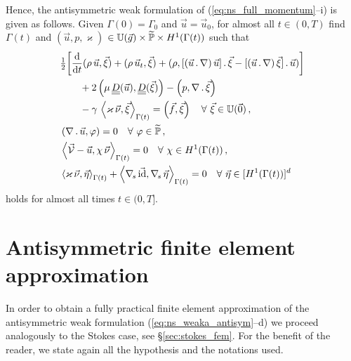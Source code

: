 Hence, the antisymmetric weak formulation of (\ref{eq:ns_full_momentum}--i) is
given as follows. Given $\Gamma(0) = \Gamma_0$ and $\vec u = \vec u_0$, for
almost all $t\in(0,T)$ find $\Gamma(t)$ and ${(\vec u, p, \varkappa)}$ ${\in
\mathbb{U}(\vec{g}) \times \widetilde{\mathbb{P}} \times H^1(\Gamma(t))}$ such that
\begin{subequations}
\begin{align}
& \tfrac{1}{2}\bigg[ \ddt (\rho\,\vec u, \vec \xi) + (\rho\,\vec u_t, \vec \xi)
+ (\rho, [(\vec u\,.\,\nabla)\,\vec u]\,.\,\vec \xi
- [(\vec u\,.\,\nabla)\,\vec \xi]\,.\,\vec u)\bigg] \nonumber \\
& \qquad +2\left(\mu\,\mat D(\vec u), \mat D(\vec \xi)\right)
- \left(p, \nabla\,.\,\vec \xi\right)\nonumber \\
& \qquad - \gamma\,\left\langle \varkappa\,\vec\nu, \vec\xi
\right\rangle_{\Gamma(t)}
= \left(\vec f, \vec \xi\right)\quad \forall\ \vec\xi \in \uspace 0 \,,
\label{eq:ns_weaka_antisym}\\
& \left(\nabla\,.\,\vec u, \varphi\right) = 0
\quad \forall\ \varphi \in \pnormspace\,, \label{eq:ns_weakb_antisym} \\
&  \left\langle \V
- \vec u, \chi\,\vec\nu \right\rangle_{\Gamma(t)} = 0
\quad \forall\ \chi \in H^1(\Gamma(t))\,, \label{eq:ns_weakc_antisym} \\
& \left\langle \varkappa\,\vec\nu, \vec\eta \right\rangle_{\Gamma(t)}
+ \left\langle \nabs\,\vec \id, \nabs\,\vec \eta \right\rangle_{\Gamma(t)}
= 0  \quad \forall\ \vec\eta \in [H^1(\Gamma(t))]^d\,\label{eq:ns_weakd_antisym}
\end{align}
\end{subequations}
holds for almost all times $t \in (0,T]$.

\section{Antisymmetric finite element approximation}\label{sec:ns_fem_antisym}
In order to obtain a fully practical finite element approximation of the
antisymmetric weak formulation (\ref{eq:ns_weaka_antisym}--d) we proceed
analogously to the Stokes case, see \S\ref{sec:stokes_fem}. For the benefit of
the reader, we state again all the hypothesis and the notations used.


